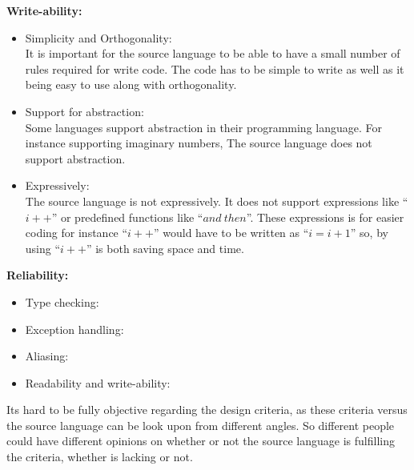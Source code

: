 \textbf{Write-ability:} \\
\begin{itemize}
\item Simplicity and Orthogonality: \\
It is important for the source language to be able to have a small number of rules required for write code. The code has to be simple to write as well as it being easy to use along with orthogonality.
\item Support for abstraction: \\
Some languages support abstraction  in their programming language. For instance supporting imaginary numbers, The source language does not support abstraction. 
\item Expressively: \\
The source language is not expressively. It does not support expressions like ``$i++$'' or predefined functions like ``$and~then$''. These expressions is for easier coding for instance ``$i++$'' would have to be written as ``$i = i + 1$'' so, by using ``$i++$'' is both saving space and time.
\end{itemize}

\textbf{Reliability:} \\
\begin{itemize}
\item Type checking: \\

\item Exception handling: \\

\item Aliasing: \\

\item Readability and write-ability: \\

\end{itemize}
Its hard to be fully objective regarding the design criteria, as these criteria versus the source language can be look upon from different angles. So different people could have different opinions on whether or not the source language is fulfilling the criteria, whether is lacking or not. 